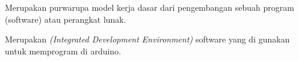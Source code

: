 Merupakan purwarupa model kerja dasar dari pengembangan sebuah program (software) atau perangkat lunak.

Merupakan  \textit{(Integrated Development Environment)} software yang di gunakan untuk memprogram di arduino.
